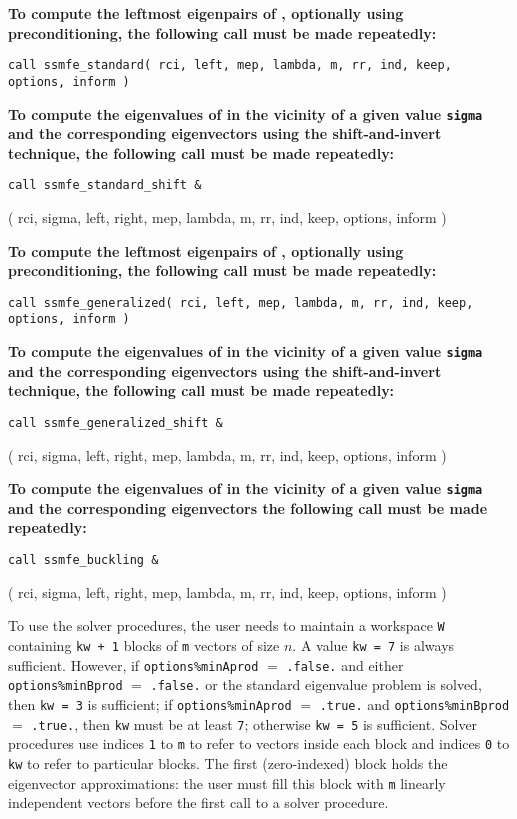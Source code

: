 {\bf
To compute 
the leftmost eigenpairs of ,
optionally using preconditioning,
the following call must be made repeatedly:
}

\medskip
{\tt call
ssmfe\_standard( rci, left, mep, lambda, m, rr, ind, keep, options, inform )
}

\medskip
\noindent
{\bf
To compute the eigenvalues of  %
in the vicinity of a given value {\tt sigma}
and the corresponding eigenvectors using the shift-and-invert technique,
the following call must be made repeatedly:
}

\medskip
{\tt call
ssmfe\_standard\_shift \&

\hspace{8mm} 
( rci, sigma, left, right, mep, lambda, m, rr, ind, keep, options, inform )
}

\medskip
\noindent
{\bf
To compute the leftmost eigenpairs of ,
optionally using preconditioning,
the following call must be made repeatedly:
}

\medskip
{\tt call
ssmfe\_generalized( rci, left, mep, lambda, m, rr, ind, 
keep, options, inform )
}

\medskip
\noindent
{\bf
To compute the eigenvalues of  %
in the vicinity of 
a given value {\tt sigma}
and the corresponding eigenvectors using the shift-and-invert technique,
the following call must be made repeatedly:
}

\medskip
{\tt call
ssmfe\_generalized\_shift \&

\hspace{8mm} 
( rci, sigma, left, right, mep, lambda, m, rr, ind, keep, options, inform )
}

\medskip
\noindent
{\bf
To compute the eigenvalues of 
in the vicinity of a given value {\tt sigma}
and the corresponding eigenvectors 
the following call must be made repeatedly:
}

\medskip
{\tt call
ssmfe\_buckling \&

\hspace{8mm} 
( rci, sigma, left, right, mep, lambda, m, rr, ind, keep, options, inform )
}

\medskip
To use the solver procedures,
the user needs to maintain a workspace {\tt W} containing
{\tt kw + 1} blocks of {\tt m} vectors of size $n$.
A value {\tt kw = 7} is always sufficient. 
However, if {\tt options\%minAprod} $=$ {\tt .false.}
and either {\tt options\%minBprod} $=$ {\tt .false.} or 
the standard eigenvalue problem  is solved,
then {\tt kw = 3} is sufficient; 
if 
{\tt options\%minAprod} $=$ {\tt .true.} and
{\tt options\%minBprod} $=$ {\tt .true.},
then {\tt kw} must be at least {\tt 7};
otherwise {\tt kw = 5} is sufficient.
Solver procedures
use indices {\tt 1} to {\tt m} 
to refer to vectors inside each block
and indices {\tt 0} to {\tt kw} 
to refer to particular blocks.
The first (zero-indexed) block holds the eigenvector approximations:
the user must fill this block with 
{\tt m} linearly independent vectors before the first call
to a solver procedure.

